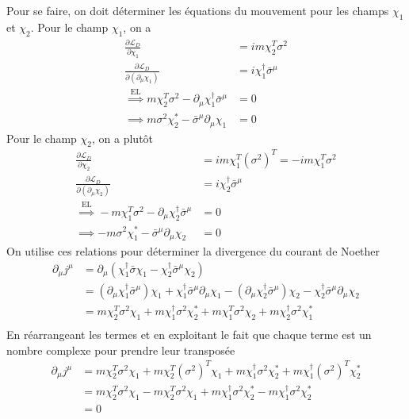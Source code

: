 \documentclass{article}
\numberwithin{equation}{section}
\theoremstyle{solution}
\begin{document}
Pour se faire, on doit déterminer les équations du mouvement pour les champs $\chi_1$ et $\chi_2$.
Pour le champ $\chi_1$, on a
\begin{align*}
        \frac{\partial \mathcal{L}_D}{\partial \chi_1} &= im \chi_2^{T}\sigma^{2} \\
        \frac{\partial \mathcal{L}_D}{\partial (\partial_\mu \chi_1)} &= i \chi_1^{\dagger} \bar{\sigma}^{\mu}  \\
        \overset{\mathrm{EL}}{\implies} m \chi_2^{T} \sigma^{2} - \partial_\mu \chi_1^{\dagger} \bar{\sigma}^{\mu} &= 0 \\
        \implies m \sigma^{2} \chi_2^{*} - \bar{\sigma}^{\mu} \partial_\mu\chi_1 &= 0 
\end{align*}
Pour le champ $\chi_2$, on a plutôt
\begin{align*}
       \frac{\partial \mathcal{L}_D}{\partial \chi_2} &= im\chi_1^{T}(\sigma^{2})^{T} = -im\chi_1^{T}\sigma^{2} \\
       \frac{\partial \mathcal{L}_D}{\partial (\partial_\mu \chi_2)} &= i \chi_2^{\dagger}\bar{\sigma}^{\mu} \\
       \overset{\mathrm{EL}}{\implies} -m\chi_1^{T}\sigma^{2} - \partial_\mu \chi_2^{\dagger}\bar{\sigma}^{\mu} &= 0 \\
       \implies -m\sigma^{2}\chi_1^{*} - \bar{\sigma}^{\mu} \partial_\mu \chi_2 &= 0
\end{align*}
On utilise ces relations pour déterminer la divergence du courant de Noether
\begin{align*}
        \partial_\mu j^{\mu} &=  \partial_\mu(\chi_1^{\dagger}\bar{\sigma}\chi_1 - \chi_2^{\dagger} \bar{\sigma}^{\mu} \chi_2) \\
        &= (\partial_\mu \chi_1^{\dagger} \bar{\sigma}^{\mu})\chi_1 + \chi_1^{\dagger}\bar{\sigma}^{\mu}\partial_\mu\chi_1
                - (\partial_\mu \chi_2^{\dagger} \bar{\sigma}^{\mu}) \chi_2 
                - \chi_2^{\dagger} \bar{\sigma}^{\mu} \partial_\mu\chi_2 \\
        &=      m\chi_2^{T}\sigma^{2}\chi_1 
                + m\chi_1^{\dagger}\sigma^{2}\chi_2^{*}
                + m\chi_1^{T}\sigma^{2} \chi_2 
                + m\chi_2^{\dagger} \sigma^{2}\chi_1^{*}\\
\end{align*}
En réarrangeant les termes et en exploitant le fait que chaque terme est un nombre complexe pour prendre
leur transposée
\begin{align*}
        \partial_\mu j^{\mu}   
        &=      m\chi_2^{T}\sigma^{2}\chi_1 
                + m\chi_2^{T}(\sigma^{2})^{T} \chi_1
                + m\chi_1^{\dagger}\sigma^{2}\chi_2^{*}
                + m\chi_1^{\dagger} (\sigma^{2})^{T}\chi_2^{*}\\
        &=      m\chi_2^{T}\sigma^{2}\chi_1 
                - m\chi_2^{T}\sigma^{2} \chi_1
                + m\chi_1^{\dagger}\sigma^{2}\chi_2^{*}
                - m\chi_1^{\dagger} \sigma^{2}\chi_2^{*}\\
        &= 0
\end{align*}
\end{document}
